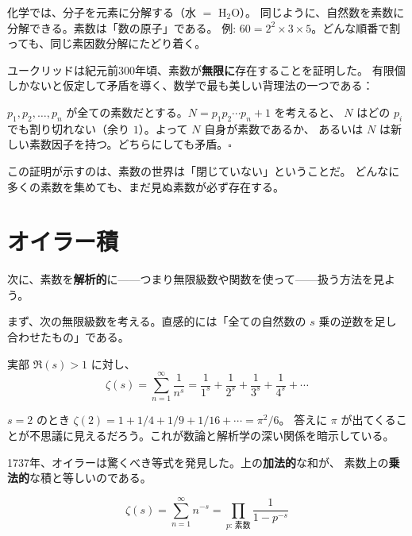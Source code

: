 \documentclass[11pt,a4paper]{article}
\theoremstyle{definition}
\begin{document}
\begin{hsbox}
化学では、分子を元素に分解する（水 $=$ H${}_2$O）。
同じように、自然数を素数に分解できる。素数は「数の原子」である。
例: $60 = 2^2 \times 3 \times 5$。どんな順番で割っても、同じ素因数分解にたどり着く。
\end{hsbox}

ユークリッドは紀元前300年頃、素数が\textbf{無限に}存在することを証明した。
有限個しかないと仮定して矛盾を導く、数学で最も美しい背理法の一つである：

$p_1, p_2, \ldots, p_n$ が全ての素数だとする。$N = p_1 p_2 \cdots p_n + 1$ を考えると、
$N$ はどの $p_i$ でも割り切れない（余り $1$）。よって $N$ 自身が素数であるか、
あるいは $N$ は新しい素数因子を持つ。どちらにしても矛盾。$\square$

この証明が示すのは、素数の世界は「閉じていない」ということだ。
どんなに多くの素数を集めても、まだ見ぬ素数が必ず存在する。

\section{オイラー積}
\label{sec:1.2}

次に、素数を\textbf{解析的}に——つまり無限級数や関数を使って——扱う方法を見よう。

まず、次の無限級数を考える。直感的には「全ての自然数の $s$ 乗の逆数を足し合わせたもの」である。

\begin{dfnbox}[定義: リーマンのゼータ関数]
実部 $\Re(s) > 1$ に対し、
\[
  \zeta(s) = \sum_{n=1}^{\infty} \frac{1}{n^s}
           = \frac{1}{1^s} + \frac{1}{2^s} + \frac{1}{3^s} + \frac{1}{4^s} + \cdots
\]
\end{dfnbox}

\begin{hsbox}
$s=2$ のとき $\zeta(2) = 1 + 1/4 + 1/9 + 1/16 + \cdots = \pi^2/6$。
答えに $\pi$ が出てくることが不思議に見えるだろう。これが数論と解析学の深い関係を暗示している。
\end{hsbox}

1737年、オイラーは驚くべき等式を発見した。上の\textbf{加法的}な和が、
素数上の\textbf{乗法的}な積と等しいのである。

\begin{keybox}[オイラー積公式]
\[
  \zeta(s) = \sum_{n=1}^{\infty} n^{-s}
           = \prod_{p:\,\text{素数}} \frac{1}{1 - p^{-s}}
\]
\end{keybox}
\end{document}
